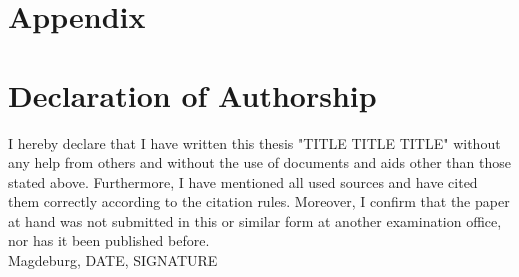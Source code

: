\section{Appendix}

\null\newpage

% 
\printbibliography
\newpage

\section{Declaration of Authorship}
I hereby declare that I have written this thesis "TITLE TITLE TITLE"
without any help from others and without the use of documents and aids
other than those stated above. Furthermore, I have mentioned all used
sources and have cited them correctly according to the citation rules.
Moreover, I confirm that the paper at hand was not submitted in this or
similar form at another examination office, nor has it been published
before.
\\
Magdeburg, DATE, SIGNATURE